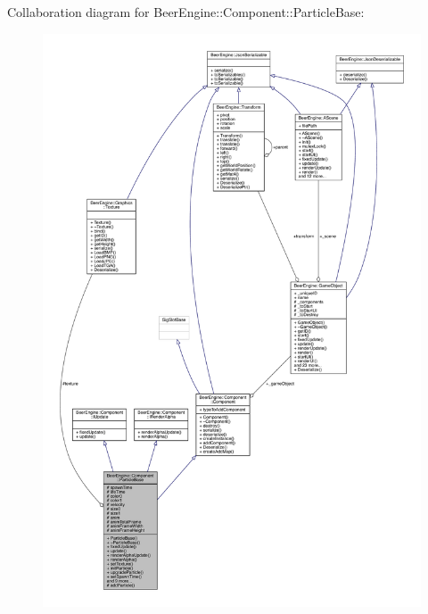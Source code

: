 Collaboration diagram for Beer\+Engine\+:\+:Component\+:\+:Particle\+Base\+:\nopagebreak
\begin{figure}[H]
\begin{center}
\leavevmode
\includegraphics[width=350pt]{class_beer_engine_1_1_component_1_1_particle_base__coll__graph}
\end{center}
\end{figure}

